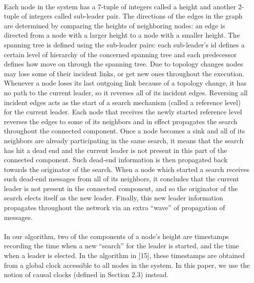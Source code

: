 \documentclass{article}
\begin{document}
\paragraph{}Each node in the system has a 7-tuple of integers called a height and another 2-tuple of integers called sub-leader pair. The directions of the edges in the graph are determined by comparing the heights of neighboring nodes: an edge is directed from a node with a larger height to a node with a smaller height. The spanning tree is defined using the sub-leader pairs: each sub-leader's id defines a certain level of hierarchy of the concerned spanning tree and each predecessor defines how move on through the spanning tree. Due to topology changes nodes may lose some of their incident links, or get new ones throughout the execution. Whenever a node loses its last outgoing link because of a topology change, it has no path to the current leader, so it reverses all of its incident edges. Reversing all incident edges acts as the start of a search mechanism (called a reference level) for the current leader. Each node that receives the newly started reference level reverses the edges to some of its neighbors and in effect propagates the search throughout the connected component. Once a node becomes a sink and all of its neighbors are already participating in the same search, it means that the search has hit a dead end and the current leader is not present in this part of the connected component. Such dead-end information is then propagated back towards the originator of the search. When a node which started a search receives such dead-end messages from all of its neighbors, it concludes that the current leader is not present in the connected component, and so the originator of the search elects itself as the new leader. Finally, this new leader information propagates throughout the network via an extra “wave” of propagation of messages.
\paragraph{}In our algorithm, two of the components of a node’s height are timestamps recording the time when a new “search” for the leader is started, and the time when a leader is elected. In the algorithm in [15], these timestamps are obtained from a global clock accessible to all nodes in the system. In this paper, we use the notion of causal clocks (defined in Section 2.3) instead.
\end{document}
